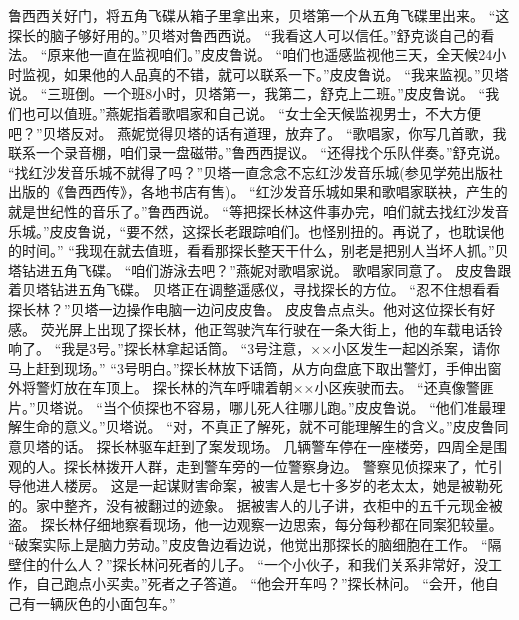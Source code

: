 \documentclass[a4paper,12pt,UTF8,twoside]{ctexbook}
\begin{document}
        鲁西西关好门，将五角飞碟从箱子里拿出来，贝塔第一个从五角飞碟里出来。  
        “这探长的脑子够好用的。”贝塔对鲁西西说。  
        “我看这人可以信任。”舒克谈自己的看法。  
        “原来他一直在监视咱们。”皮皮鲁说。  
        “咱们也遥感监视他三天，全天候24小时监视，如果他的人品真的不错，就可以联系一下。”皮皮鲁说。  
        “我来监视。”贝塔说。  
        “三班倒。一个班8小时，贝塔第一，我第二，舒克上二班。”皮皮鲁说。  
        “我们也可以值班。”燕妮指着歌唱家和自己说。  
        “女士全天候监视男士，不大方便吧？”贝塔反对。  
        燕妮觉得贝塔的话有道理，放弃了。  
        “歌唱家，你写几首歌，我联系一个录音棚，咱们录一盘磁带。”鲁西西提议。  
        “还得找个乐队伴奏。”舒克说。  
        “找红沙发音乐城不就得了吗？”贝塔一直念念不忘红沙发音乐城(参见学苑出版社出版的《鲁西西传》，各地书店有售)。  
        “红沙发音乐城如果和歌唱家联袂，产生的就是世纪性的音乐了。”鲁西西说。  
        “等把探长林这件事办完，咱们就去找红沙发音乐城。”皮皮鲁说，“要不然，这探长老跟踪咱们。也怪别扭的。再说了，也耽误他的时间。”  
        “我现在就去值班，看看那探长整天干什么，别老是把别人当坏人抓。”贝塔钻进五角飞碟。  
        “咱们游泳去吧？”燕妮对歌唱家说。  
        歌唱家同意了。        
        皮皮鲁跟着贝塔钻进五角飞碟。  
        贝塔正在调整遥感仪，寻找探长的方位。  
        “忍不住想看看探长林？”贝塔一边操作电脑一边问皮皮鲁。  
        皮皮鲁点点头。他对这位探长有好感。  
        荧光屏上出现了探长林，他正驾驶汽车行驶在一条大街上，他的车载电话铃响了。  
        “我是3号。”探长林拿起话筒。  
        “3号注意，××小区发生一起凶杀案，请你马上赶到现场。”  
        “3号明白。”探长林放下话筒，从方向盘底下取出警灯，手伸出窗外将警灯放在车顶上。  
        探长林的汽车呼啸着朝××小区疾驶而去。  
        “还真像警匪片。”贝塔说。  
        “当个侦探也不容易，哪儿死人往哪儿跑。”皮皮鲁说。  
        “他们准最理解生命的意义。”贝塔说。  
        “对，不真正了解死，就不可能理解生的含义。”皮皮鲁同意贝塔的话。  
        探长林驱车赶到了案发现场。  
        几辆警车停在一座楼旁，四周全是围观的人。探长林拨开人群，走到警车旁的一位警察身边。  
        警察见侦探来了，忙引导他进人楼房。  
        这是一起谋财害命案，被害人是七十多岁的老太太，她是被勒死的。家中整齐，没有被翻过的迹象。  
        据被害人的儿子讲，衣柜中的五千元现金被盗。  
        探长林仔细地察看现场，他一边观察一边思索，每分每秒都在同案犯较量。  
        “破案实际上是脑力劳动。”皮皮鲁边看边说，他觉出那探长的脑细胞在工作。  
        “隔壁住的什么人？”探长林问死者的儿子。  
        “一个小伙子，和我们关系非常好，没工作，自己跑点小买卖。”死者之子答道。  
        “他会开车吗？”探长林问。  
        “会开，他自己有一辆灰色的小面包车。”  
\end{document}
